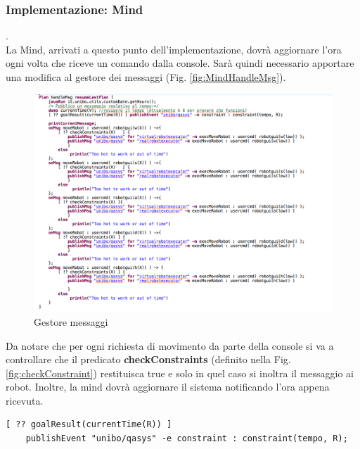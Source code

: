 \documentclass{llncs}
\begin{document}
\subsubsection{Implementazione: Mind} .
\label{ImplementazioneReq3Mind}
\vspace*{1ex}
\\
La Mind, arrivati a questo punto dell'implementazione, dovr\`a aggiornare l'ora ogni volta che riceve un comando dalla console. Sar\`a quindi necessario apportare una modifica al gestore dei messaggi (Fig. \hyperref[fig:MindHandleMsg]{\ref{fig:MindHandleMsg}}).
\begin{figure}
    \centering
    \includegraphics[width=1.3\textwidth]{Immagini/Requisito3/handleMsgReq3.png}
    \caption{Gestore messaggi}
    \label{fig:handleMsgReq3}
\end{figure}
Da notare che per ogni richiesta di movimento da parte della console si va a controllare che il predicato \textbf{checkConstraints} (definito nella Fig. \hyperref[fig:checkConstraint]{\ref{fig:checkConstraint}})  restituisca true e solo in quel caso si inoltra il messaggio ai robot. Inoltre, la mind dovr\`a aggiornare il sistema notificando l'ora appena ricevuta.
\begin{verbatim}
[ ?? goalResult(currentTime(R)) ] 
    publishEvent "unibo/qasys" -e constraint : constraint(tempo, R);
\end{verbatim}
\pagebreak
\end{document}

